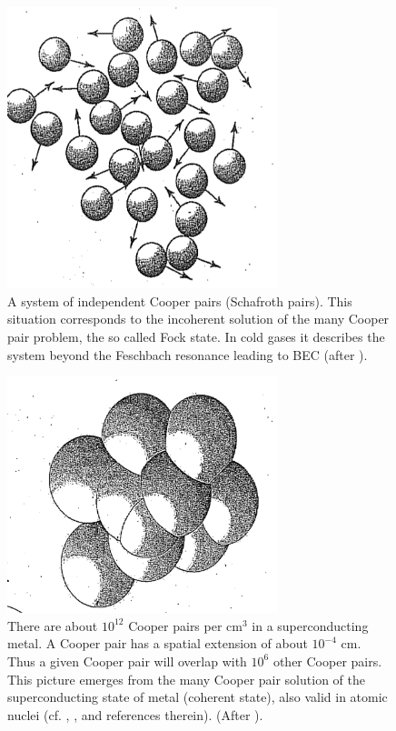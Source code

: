 \newpage
\begin{figure}[h!]
\centerline{\includegraphics*[width=0.7\textwidth,angle=0]{nutshell/figs/fig1A4.pdf}}
\caption{A system of independent Cooper pairs (Schafroth pairs). This situation corresponds to the incoherent solution of the many Cooper pair problem, the so called Fock state. In cold gases it describes the system beyond the Feschbach resonance leading to BEC (after \cite{Rogovin:76}).}\label{fig1A4}
\end{figure}
\begin{figure}
\centerline{\includegraphics*[width=0.7\textwidth,angle=0]{nutshell/figs/fig1A5.pdf}}
\caption{There are about $10^{12}$ Cooper pairs per cm$^{3}$ in a superconducting metal. A Cooper pair has a spatial extension of about $10^{-4}$ cm. Thus a given Cooper pair will overlap with  $10^{6}$ other Cooper pairs. This picture emerges from  the many Cooper pair solution of the superconducting state of metal  (coherent state), also valid in atomic nuclei (cf. \cite{Schrieffer:64}, \cite{Brink:05}, and references therein). (After \cite{Rogovin:76}).}\label{fig1A5}
\end{figure}
